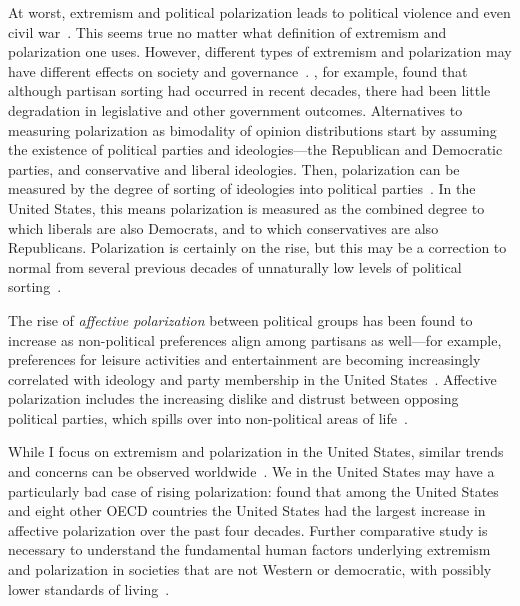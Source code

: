 At worst, extremism and political
polarization leads to political violence and even civil war~\cite{Epstein2013,Freeman2018}.
This seems true no matter what definition of extremism and polarization one
uses. However, different types of extremism and polarization may have different
effects on society and governance~\cite{Lelkes2016}. , for example,
found that although partisan sorting had occurred in recent decades, there
had been little degradation in legislative and other government outcomes.
Alternatives to measuring polarization as bimodality of opinion distributions
start by assuming the existence of political parties and ideologies---the 
Republican and Democratic parties, and conservative and liberal ideologies.
Then, polarization can be measured by the degree of sorting of ideologies
into political parties~\cite{Mason2015}.  In the United States, this means polarization is measured
as the combined degree to which liberals are also Democrats, and to which 
conservatives are also Republicans. Polarization is certainly on the rise,
but this may be a correction to normal from several previous decades of 
unnaturally low levels of political sorting~\cite{Lee2015,Wood2017b}.

The rise of
\emph{affective polarization} between political groups has been found to increase as non-political
preferences align among partisans as well---for example, preferences for
leisure activities and entertainment are becoming increasingly correlated
with ideology and party membership in the United States~\cite{Pew2014PublicPolarization,DellaPosta2015}.
Affective polarization includes the increasing dislike and distrust between opposing political parties, 
which spills over into non-political areas of life~\cite{Iyengar2019}. 

While I focus on extremism and polarization in the United States, similar trends and concerns can be observed 
worldwide~\cite{Borge-Holthoefer2014,Morales2015,Romenskyy2017,Zmigrod2018}. 
We in the United States may have a particularly bad case of rising polarization: 
 found that among the United States and eight other OECD countries
the United States had the largest increase in affective polarization over the
past four decades. Further comparative study is necessary to understand the fundamental human factors underlying
extremism and polarization in societies that are not Western or democratic,
with possibly lower standards of living~\cite{Henrich2010}.

